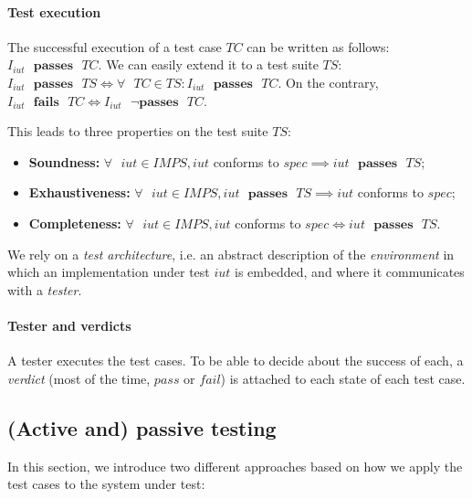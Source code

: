 \paragraph{Test execution} The successful execution of a test
case $TC$ can be written as follows: $I_{iut} \text{ }
\mathbf{passes} \text{ } TC$. We can easily extend it to a test
suite $TS$: $I_{iut} \text{ } \mathbf{passes} \text{ } TS
\Leftrightarrow \forall \text{ } TC \in TS : I_{iut} \text{ }
\mathbf{passes} \text{ } TC$. On the contrary, $I_{iut} \text{ }
\mathbf{fails} \text{ } TC \Leftrightarrow I_{iut} \text{ } \neg
\mathbf{passes} \text{ } TC$.

This leads to three properties on the test suite $TS$:

\begin{itemize}
\item \textbf{Soundness:} $\forall \text{ } iut \in IMPS, iut$
conforms to $spec \implies iut \text{ } \mathbf{passes} \text{ }
TS$;

\item \textbf{Exhaustiveness:} $\forall \text{ } iut \in IMPS,
iut \text{ } \mathbf{passes} \text{ } TS \implies iut$ conforms
to $spec$;

\item \textbf{Completeness:} $\forall \text{ } iut \in IMPS, iut$
conforms to $spec \Leftrightarrow iut \text{ } \mathbf{passes}
\text{ } TS$.
\end{itemize}

We rely on a \textit{test architecture}, i.e. an abstract
description of the \textit{environment} in which an
implementation under test $iut$ is embedded, and where it
communicates with a \textit{tester}.

\paragraph{Tester and verdicts} A tester executes the test cases.
To be able to decide about the success of each, a
\textit{verdict} (most of the time, $pass$ or $fail$) is attached
to each state of each test case.


\subsection{(Active and) passive testing}
\label{sec:related:testing:active-passive}

In this section, we introduce two different approaches based on
how we apply the test cases to the system under test:

